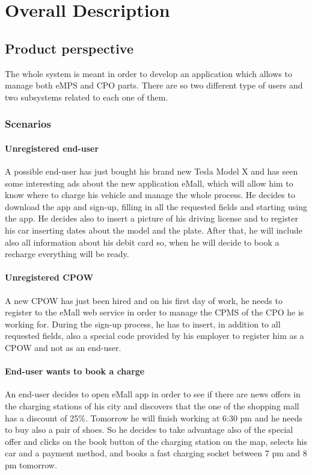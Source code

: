 \documentclass[a4paper]{report}
\begin{document}
\chapter{Overall Description}
\section{Product perspective}
The whole system is meant in order to develop an application which allows to manage both eMPS and CPO parts. There are so two different type of users and two subsystems related to each one of them.
\subsection{Scenarios}
\subsubsection{Unregistered end-user}
A possible end-user has just bought his brand new Tesla Model X and has seen some interesting ads about the new application eMall, which will allow him to know where to charge his vehicle and manage the whole process. He decides to download the app and sign-up, filling in all the requested fields and starting using the app. He decides also to insert a picture of his driving license and to register his car inserting dates about the model and the plate. After that, he will include also all information about his debit card so, when he will decide to book a recharge everything will be ready.

\subsubsection{Unregistered CPOW}
A new CPOW has just been hired and on his first day of work, he needs to register to the eMall web service in order to manage the CPMS of the CPO he is working for. During the sign-up process, he has to insert, in addition to all requested fields, also a special code provided by his employer to register him as a CPOW and not as an end-user.

\subsubsection{End-user wants to book a charge}
An end-user decides to open eMall app in order to see if there are news offers in the charging stations of his city and discovers that the one of the shopping mall has a discount of 25\%. Tomorrow he will finish working at 6:30 pm and he needs to buy also a pair of shoes. So he decides to take advantage also of the special offer and clicks on the book button of the charging station on the map, selects his car and a payment method, and books a fast charging socket between 7 pm and 8 pm tomorrow.
\end{document}
